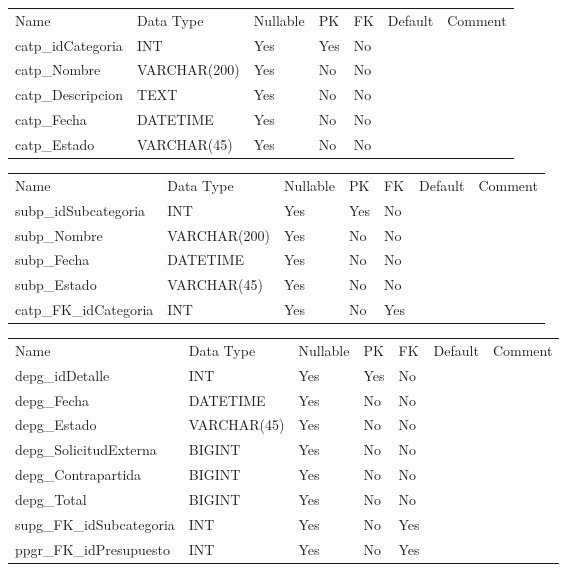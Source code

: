 			\begin{center}
				\begin{tabular}{ |l|l|l|l|l|l|l| }
					\hline
					Name & Data Type & Nullable & PK & FK & Default & Comment \\
					catp_idCategoria & INT & Yes & Yes & No &  & \\ \hline 
catp_Nombre & VARCHAR(200) & Yes & No & No &  & \\ \hline 
catp_Descripcion & TEXT & Yes & No & No &  & \\ \hline 
catp_Fecha & DATETIME & Yes & No & No &  & \\ \hline 
catp_Estado & VARCHAR(45) & Yes & No & No &  & \\ \hline 

				\end{tabular}
			\end{center}
		

			\begin{center}
				\begin{tabular}{ |l|l|l|l|l|l|l| }
					\hline
					Name & Data Type & Nullable & PK & FK & Default & Comment \\
					subp_idSubcategoria & INT & Yes & Yes & No &  & \\ \hline 
subp_Nombre & VARCHAR(200) & Yes & No & No &  & \\ \hline 
subp_Fecha & DATETIME & Yes & No & No &  & \\ \hline 
subp_Estado & VARCHAR(45) & Yes & No & No &  & \\ \hline 
catp_FK_idCategoria & INT & Yes & No & Yes &  & \\ \hline 

				\end{tabular}
			\end{center}
		

			\begin{center}
				\begin{tabular}{ |l|l|l|l|l|l|l| }
					\hline
					Name & Data Type & Nullable & PK & FK & Default & Comment \\
					depg_idDetalle & INT & Yes & Yes & No &  & \\ \hline 
depg_Fecha & DATETIME & Yes & No & No &  & \\ \hline 
depg_Estado & VARCHAR(45) & Yes & No & No &  & \\ \hline 
depg_SolicitudExterna & BIGINT & Yes & No & No &  & \\ \hline 
depg_Contrapartida & BIGINT & Yes & No & No &  & \\ \hline 
depg_Total & BIGINT & Yes & No & No &  & \\ \hline 
supg_FK_idSubcategoria & INT & Yes & No & Yes &  & \\ \hline 
ppgr_FK_idPresupuesto & INT & Yes & No & Yes &  & \\ \hline 

				\end{tabular}
			\end{center}
		

